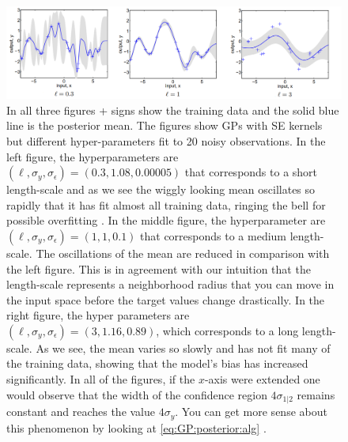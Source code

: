 \documentclass[10pt]{article}
\theoremstyle{definition}
\theoremstyle{definition}
\theoremstyle{remark}
\begin{document}
\begin{figure}[t!]
\centering
\includegraphics[width=17cm]{figs/length-scale.png}
\caption{In all three figures + signs show the training data and the solid blue line is the posterior mean. The figures show GPs with SE kernels but different hyper-parameters fit to 20 noisy observations. In the left figure, the hyperparameters are $(\ell, \sigma_y, \sigma_{\epsilon})=(0.3, 1.08, 0.00005)$ that corresponds to a short length-scale and as we see the wiggly looking mean oscillates so rapidly that it has fit almost all training data, ringing the bell for possible overfitting . In the middle figure, the hyperparameter are $(\ell, \sigma_y, \sigma_{\epsilon})=(1, 1, 0.1)$ that corresponds to a medium length-scale. The oscillations of the mean are reduced in comparison with the left figure. This is in agreement with our intuition that the length-scale represents a neighborhood radius that you can move in the input space before the target values change drastically. In the right figure, the hyper parameters are  $(\ell, \sigma_y, \sigma_{\epsilon})=(3, 1.16, 0.89)$, which corresponds to a long length-scale. As we see, the mean varies so slowly and has not fit many of the training data, showing that the model's bias has increased significantly. In all of the figures, if the $x$-axis were extended one would observe that the width of the confidence region $4\sigma_{1|2}$ remains constant and reaches the value $4\sigma_y$. You can get more sense about this phenomenon by looking at \cref{eq:GP:posterior:alg} \cite{Rasmussen2006}.}
\label{fig:length:scale}
\end{figure}
\end{document}

